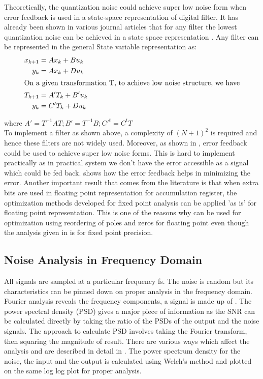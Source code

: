 \documentclass[colorlinks=true,pdfstartview=FitV,linkcolor=blue,
            citecolor=red,urlcolor=magenta]{ligodoc}
\begin{document}
Theoretically, the quantization noise could achieve super low noise \cite{Chang} form when error feedback is used in a state-space representation of digital filter. It has already been shown in various journal articles that for any filter the lowest quantization noise can be achieved in a state space representation \cite{Chang}.
Any filter can be represented in the general State variable representation as:
\begin{align}
x_{k+1} &= Ax_{k} + Bu_{k} \\
y_{k} &= Ax_{k} + Du_{k} \\
\intertext {On a given transformation T, to achieve low noise structure, we have}
T_{k+1} &= A'T_{k} + B'u_{k}\\
y_{k} &= C'T_{k} + Du_{k}
\end{align}

where $A'=T^{-1}AT; B'=T^{-1}B; C'^{t}=C^{t}T$
\\To implement a filter as shown above, a complexity of $(N+1)^{2}$ is required and hence these filters are not widely used. Moreover, as shown in \cite{Chang}, error feedback could be used to achieve super low noise forms. This is hard to implement practically as in practical system we don't have the error accessible as a signal which could be fed back. \cite{Mullis} shows how the error feedback helps in minimizing the error.
Another important result that comes from the literature is that when extra bits are used in floating point representation for accumulation register, the optimization methods developed for fixed point analysis can be applied 'as is' for floating point representation\cite{Bomar}. This is one of the reasons why \cite{Dehner} can be used for  optimization using reordering of poles and zeros for floating point even though the analysis given in \cite{Dehner} is for fixed point precision.
\\
	\subsection{Noise Analysis in Frequency Domain}
All signals are sampled at a particular frequency fs. The noise is random but its characteristics can be pinned down on proper analysis in the frequency domain. Fourier analysis reveals the frequency components, a signal is made up of \cite{Oppenheim}. The power spectral density (PSD) \cite{Cerna} gives a major piece of information as the SNR can be calculated directly by taking the ratio of the PSDs of the output and the noise signals. The approach to calculate PSD involves taking the Fourier transform, then squaring the magnitude of result. There are various ways which affect the analysis and are described in detail in \cite{Kanner}. The power spectrum density for the noise, the input and the output is calculated using Welch's method \cite{Welch} and plotted on the same log log plot for proper analysis. 
	
\end{document}
